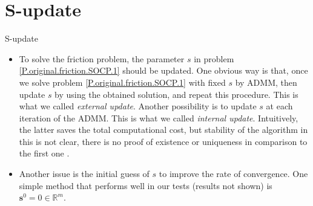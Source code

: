 \documentclass[8pt,red]{beamer}
\theoremstyle{plain}
\theoremstyle{definition}
\theoremstyle{remark}
\renewcommand{\Re}{\ensuremath{\mathbb{R}}}
\newcommand{\bi}[1]{\ensuremath{\boldsymbol{#1}}}
\begin{document}
\section{S-update}
\begin{frame}{S-update}
\begin{itemize}
\item To solve the friction problem, the parameter $s$ in problem \eqref{P.original.friction.SOCP.1} should be updated. One obvious way is that, once we solve problem \eqref{P.original.friction.SOCP.1} with fixed $s$ by ADMM, then update $s$ by using the obtained solution, and repeat this procedure. This is what we called \textit{external update}. Another possibility is to update $s$ at each iteration of the ADMM. This is what we called \textit{internal update}. Intuitively, the latter saves the total computational cost, but stability of the algorithm in this is not clear, there is no proof of existence or uniqueness in comparison to the first one \citep{acary2011formulation}.
\item Another issue is the initial guess of $s$ to improve the rate of convergence. One simple method that performs well in our tests (results not shown) is $\bi{s}^{0} = 0 \in \Re^{m}$.
\end{itemize}
\end{frame}
\end{document}

